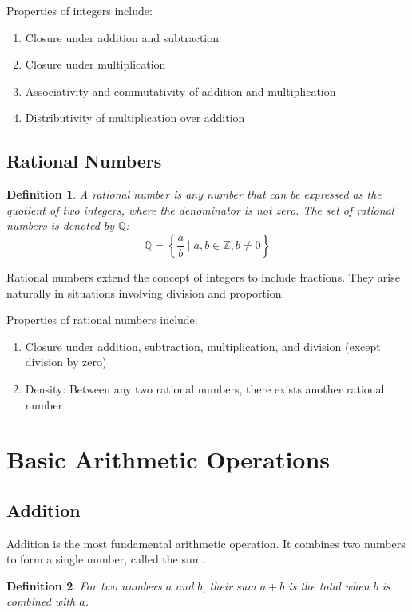 \documentclass[12pt,a4paper]{article}
\newtheorem{definition}{Definition}
\begin{document}
Properties of integers include:

\begin{enumerate}
    \item Closure under addition and subtraction
    \item Closure under multiplication
    \item Associativity and commutativity of addition and multiplication
    \item Distributivity of multiplication over addition
\end{enumerate}

\subsection{Rational Numbers}

\begin{definition}
A rational number is any number that can be expressed as the quotient of two integers, where the denominator is not zero. The set of rational numbers is denoted by $\mathbb{Q}$:
\[ \mathbb{Q} = \left\{\frac{a}{b} \mid a, b \in \mathbb{Z}, b \neq 0\right\} \]
\end{definition}

Rational numbers extend the concept of integers to include fractions. They arise naturally in situations involving division and proportion.

Properties of rational numbers include:

\begin{enumerate}
    \item Closure under addition, subtraction, multiplication, and division (except division by zero)
    \item Density: Between any two rational numbers, there exists another rational number
\end{enumerate}

\section{Basic Arithmetic Operations}

\subsection{Addition}

Addition is the most fundamental arithmetic operation. It combines two numbers to form a single number, called the sum.

\begin{definition}
For two numbers $a$ and $b$, their sum $a + b$ is the total when $b$ is combined with $a$.
\end{definition}
\end{document}
